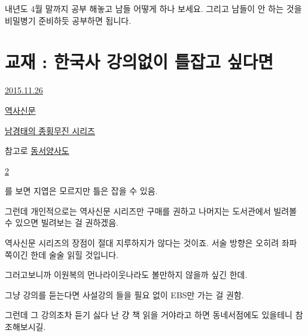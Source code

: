 내년도 4월 말까지 공부 해놓고 남들 어떻게 하나 보세요.
그리고 남들이 안 하는 것을 비밀병기 준비하듯 공부하면 됩니다.
\vspace{5mm}





\section{교재 : 한국사 강의없이 틀잡고 싶다면}
\href{https://www.kockoc.com/Apoc/511903}{2015.11.26}

\vspace{5mm}

\href{http://www.yes24.com/24/goods/2987183?scode=032&OzSrank=4}{역사신문}

\vspace{5mm}

\href{http://www.yes24.com/24/goods/17403469?scode=032&OzSrank=1}{남경태의 종횡무진 시리즈}
\vspace{5mm}

참고로 
\href{http://www.yes24.com/24/goods/17403476?scode=032&OzSrank=2}{동서양사도}
\vspace{5mm}

\href{http://www.yes24.com/24/goods/17403471?scode=032&OzSrank=3}{2}

\vspace{5mm}

를 보면 지엽은 모르지만 틀은 잡을 수 있음.
\vspace{5mm}

그런데 개인적으로는 역사신문 시리즈만 구매를 권하고 나머지는 도서관에서 빌려볼 수 있으면 빌려보는 걸 권하겠음.
\vspace{5mm}

역사신문 시리즈의 장점이 절대 지루하지가 않다는 것이죠. 서술 방향은 오히려 좌파 쪽이긴 한데 술술 읽힐 것입니다.
\vspace{5mm}

그러고보니까 이원복의 먼나라이웃나라도 볼만하지 않을까 싶긴 한데.
\vspace{5mm}

그냥 강의를 듣는다면 사설강의 들을 필요 없이 EBS만 가는 걸 권함.
\vspace{5mm}

그런데 그 강의조차 듣기 싫다 난 걍 책 읽을 거야라고 하면 동네서점에도 있을테니 참조해보시길.
\vspace{5mm}






